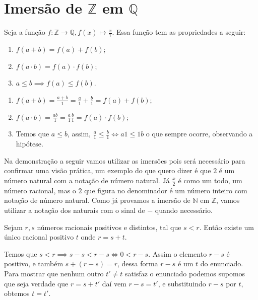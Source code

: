 \documentclass[../main.tex]{subfiles}
\begin{document}
\section{Imersão de $\mathbb{Z}$ em $\mathbb{Q}$}
\begin{teo}\label{rac-teo-imersao}
    Seja a função $f: \mathbb{Z} \rightarrow \mathbb{Q}, f(x) \mapsto \frac{x}{1}$. Essa função tem as propriedades a seguir:
    \begin{enumerate}[label=(\roman*)]
        \item $f(a + b) = f(a) + f(b)$;
        \item $f(a \cdot b) = f(a) \cdot f(b)$;
        \item $a \leq b \implies f(a) \leq f(b)$.
    \end{enumerate}
\end{teo}
\begin{dem}
    \begin{enumerate}[label=(\roman*)]
        \item $f(a + b) = \frac{a+b}{1} = \frac{a}{1} + \frac{b}{1} = f(a) + f(b)$;
        \item $f(a \cdot b) = \frac{ab}{1} = \frac{a}{1} \frac{b}{1} = f(a) \cdot f(b)$;
        \item Temos que $a \leq b$, assim, $\frac{a}{1} \leq \frac{b}{1} \iff a1 \leq 1b$ o que sempre ocorre, observando a hipótese.
    \end{enumerate}
\end{dem}

Na demonstração a seguir vamos utilizar as imersões pois será necessário para confirmar uma visão prática, um exemplo do que quero dizer é que $2$ é um número natural com a notação de número natural. Já $\frac{x}{2}$ é como um todo, um número racional, mas o $2$ que figura no denominador é um número inteiro com notação de número natural. Como já provamos a imersão de $\mathbb{N}$ em $\mathbb{Z}$, vamos utilizar a notação dos naturais com o sinal de $-$ quando necessário.

\begin{prop}\label{rac-prop-diferencaPositiva}
    Sejam $r,s$ números racionais positivos e distintos, tal que $s < r$. Então existe um único racional positivo $t$ onde $r = s+t$.
\end{prop}
\begin{dem}
    Temos que $s<r \implies s-s < r-s \iff 0 < r-s$. Assim o elemento $r-s$ é positivo, e também $s+(r-s) = r$, dessa forma $r-s$ é um $t$ do enunciado. Para mostrar que nenhum outro $t' \neq t$ satisfaz o enunciado podemos supomos que seja verdade que $r=s+t'$ daí vem $r-s=t'$, e substituindo $r-s$ por $t$, obtemos $t = t'$. 
\end{dem}
\end{document}
